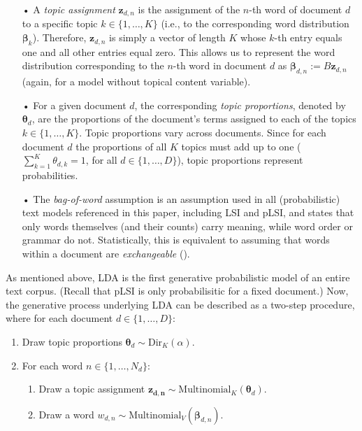 \begin{itemize}
\vspace{-0.25cm}
\item[•] A \textit{topic assignment} $\boldsymbol{z}_{d,n}$ is the assignment of the $n$-th word of document $d$ to a specific topic $k \in \{1,\dots,K\}$ (i.e., to the corresponding word distribution $\boldsymbol{\beta}_k$). Therefore, $\boldsymbol{z}_{d,n}$ is simply a vector of length $K$ whose $k$-th entry equals one and all other entries equal zero. This allows us to represent the word distribution corresponding to the $n$-th word in document $d$ as $\boldsymbol{\beta}_{d,n}:=B\boldsymbol{z}_{d,n}$ (again, for a model without topical content variable).
\vspace{-0.25cm}
\item[•] For a given document $d$, the corresponding \textit{topic proportions}, denoted by $\boldsymbol{\theta}_d$, are the proportions of the document's terms assigned to each of the topics $k \in \{1,\dots,K\}$. Topic proportions vary across documents. Since for each document $d$ the proportions of all $K$ topics must add up to one ($\sum_{k=1}^{K}\theta_{d,k}=1$, for all $d \in \{1,\dots,D\}$), topic proportions represent probabilities.
\vspace{-0.25cm}
\item[•] The \textit{bag-of-word} assumption is an assumption used in all (probabilistic) text models referenced in this paper, including LSI and pLSI, and states that only words themselves (and their counts) carry meaning, while word order or grammar do not. Statistically, this is equivalent to assuming that words within a document are \textit{exchangeable} (\citealp{aldous1985exchangeability}).

\end{itemize}

As mentioned above, LDA is the first generative probabilistic model of an entire text corpus. (Recall that pLSI is only probabilisitic for a fixed document.) 
Now, the generative process underlying LDA can be described as a two-step procedure, where for each document $d \in \{1,\dots,D\}$:

\begin{enumerate}[{1)}]
\vspace{-0.25cm}
\item Draw topic proportions $\boldsymbol{\theta}_d \sim \text{Dir}_K(\alpha)$.
\vspace{-0.25cm}
\item For each word $n \in \{1,\dots,N_d\}$:
	\begin{enumerate}[{a)}]
	\vspace{-0.25cm}    
    \item Draw a topic assignment $\boldsymbol{z_{d,n}} \sim \text{Multinomial}_K(\boldsymbol{\theta}_d)$.
	\vspace{-0.25cm}    
    \item Draw a word $w_{d,n} \sim \text{Multinomial}_V(\boldsymbol{\beta}_{d,n})$.
	\end{enumerate}
\end{enumerate}

